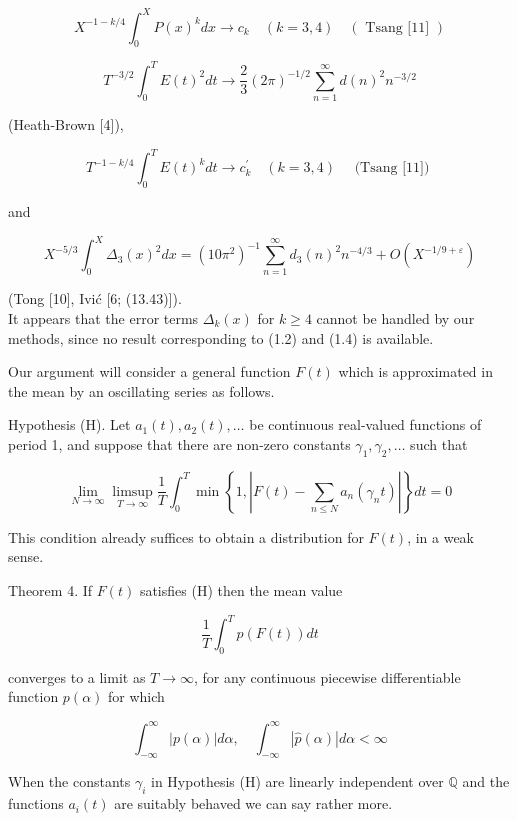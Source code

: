 \documentclass[10pt]{article}
\begin{document}
$$
X^{-1-k / 4} \int_{0}^{X} P(x)^{k} d x \rightarrow c_{k} \quad(k=3,4) \quad(\text { Tsang [11] })
$$

\begin{equation*}
T^{-3 / 2} \int_{0}^{T} E(t)^{2} d t \rightarrow \frac{2}{3}(2 \pi)^{-1 / 2} \sum_{n=1}^{\infty} d(n)^{2} n^{-3 / 2} \tag{1.3}
\end{equation*}

(Heath-Brown [4]),

$$
T^{-1-k / 4} \int_{0}^{T} E(t)^{k} d t \rightarrow c_{k}^{\prime} \quad(k=3,4) \quad \text { (Tsang [11]) }
$$

and


\begin{equation*}
X^{-5 / 3} \int_{0}^{X} \Delta_{3}(x)^{2} d x=\left(10 \pi^{2}\right)^{-1} \sum_{n=1}^{\infty} d_{3}(n)^{2} n^{-4 / 3}+O\left(X^{-1 / 9+\varepsilon}\right) \tag{1.4}
\end{equation*}


(Tong [10], Ivić [6; (13.43)]).\\
It appears that the error terms $\Delta_{k}(x)$ for $k \geq 4$ cannot be handled by our methods, since no result corresponding to (1.2) and (1.4) is available.

Our argument will consider a general function $F(t)$ which is approximated in the mean by an oscillating series as follows.

Hypothesis (H). Let $a_{1}(t), a_{2}(t), \ldots$ be continuous real-valued functions of period 1, and suppose that there are non-zero constants $\gamma_{1}, \gamma_{2}, \ldots$ such that

$$
\lim _{N \rightarrow \infty} \limsup _{T \rightarrow \infty} \frac{1}{T} \int_{0}^{T} \min \left\{1,\left|F(t)-\sum_{n \leq N} a_{n}\left(\gamma_{n} t\right)\right|\right\} d t=0
$$

This condition already suffices to obtain a distribution for $F(t)$, in a weak sense.

Theorem 4. If $F(t)$ satisfies (H) then the mean value

$$
\frac{1}{T} \int_{0}^{T} p(F(t)) d t
$$

converges to a limit as $T \rightarrow \infty$, for any continuous piecewise differentiable function $p(\alpha)$ for which

$$
\int_{-\infty}^{\infty}|p(\alpha)| d \alpha, \quad \int_{-\infty}^{\infty}|\widehat{p}(\alpha)| d \alpha<\infty
$$

When the constants $\gamma_{i}$ in Hypothesis (H) are linearly independent over $\mathbb{Q}$ and the functions $a_{i}(t)$ are suitably behaved we can say rather more.
\end{document}
